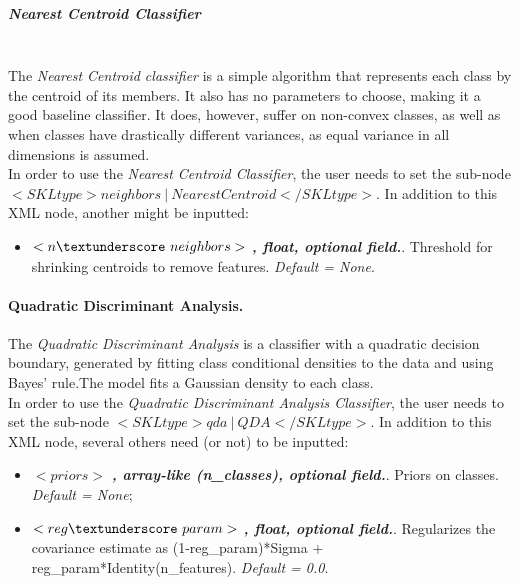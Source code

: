 \subparagraph{Nearest Centroid Classifier}
\mbox{}
\\The \textit{Nearest Centroid classifier} is a simple algorithm that represents each class by the centroid of its members. It also has no parameters to choose, making it a good baseline classifier. It does, however, suffer on non-convex classes, as well as when classes have drastically different variances, as equal variance in all dimensions is assumed.
\\In order to use the   \textit{Nearest Centroid Classifier}, the user needs to set the sub-node $<SKLtype>neighbors~\vert~NearestCentroid</SKLtype>$. In addition to this XML node, another might be inputted:
\begin{itemize}
\item $<n\textunderscore~neighbors>$ \textbf{\textit{, float, optional field.}}.  Threshold for shrinking centroids to remove features. \textit{Default = None}.
\end{itemize}

\paragraph{Quadratic Discriminant Analysis.}
\label{QDA}
The \textit{Quadratic Discriminant Analysis} is a classifier with a quadratic decision boundary, generated by fitting class conditional densities to the data and using Bayes’ rule.The model fits a Gaussian density to each class.
\\In order to use the   \textit{Quadratic Discriminant Analysis Classifier}, the user needs to set the sub-node $<SKLtype>qda~\vert~QDA</SKLtype>$. In addition to this XML node, several others need (or not) to be inputted:
\begin{itemize}
\item $<priors>$ \textbf{\textit{, array-like (n\_classes), optional field.}}.  Priors on classes. \textit{Default = None};
\item $<reg\textunderscore~param>$ \textbf{\textit{, float, optional field.}}. Regularizes the covariance estimate as (1-reg\_param)*Sigma + reg\_param*Identity(n\_features). \textit{Default = 0.0}.
\end{itemize}

